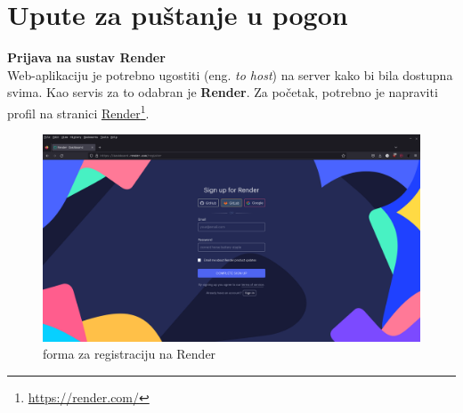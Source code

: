 			\eject 
		
		\section{Upute za puštanje u pogon}
		
		
			
			
			 
			 \textbf{Prijava na sustav Render}\\
			 
			 
			 Web-aplikaciju je potrebno ugostiti (eng. \textit{to host}) na server kako bi bila dostupna svima. Kao servis za to odabran je \textbf{Render}. Za početak, potrebno je napraviti profil na stranici \underline{Render}\footnote{\url{https://render.com/}}.
			 \begin{figure}[H]
			\includegraphics[width=\textwidth]{slike/signup.png} %
			\caption{forma za registraciju na Render}
			\label{fig:signup} %
			\end{figure}
			 
